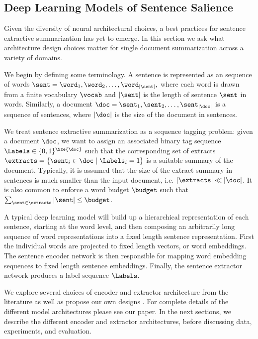 

\subsection{Deep Learning Models of Sentence Salience}

 Given the diversity of neural architectural choices, a best practices
for sentence extractive summarization has yet to emerge. In this section
we ask what architecture design choices matter for single document 
summarization across a variety of domains.

We begin by defining some terminology. A sentence is represented as an
sequence of words $\sent = \word_1, \word_2, \ldots, \word_{|\sent|},$
where each word is drawn from a finite vocabulary $\vocab$ and $|\sent|$ is
the length of sentence $\sent$ in words. Similarly, a document $\doc =  
\sent_1, \sent_2, \ldots, \sent_{|\doc|} $ is a sequence of sentences, where 
$|\doc|$ is the size of the document in sentences.  

We treat sentence extractive summarization as a sequence tagging
problem: given a document $\doc$, we want to assign an associated binary
tag sequence $\Labels \in \{0,1\}^{\Sze{\doc}}$ such that the corresponding
set of extracts $\extracts = \{\sent_i \in \doc \; | \; \Labels_i =1 \}$ is
a suitable summary
of the document. Typically, it is assumed that the size of the extract summary
in sentences is much smaller than the input document, i.e. 
$|\extracts|  \ll |\doc|$.
It is also common to enforce a word budget $\budget$ such that
$\sum_{\sent \in \extracts} |\sent| \le \budget$.

A typical deep learning model will build up a hierarchical representation
of each sentence, starting at the word level, and then composing an arbitrarily
long sequence of word representations into a fixed length sentence 
representation.
First the individual words are 
projected to fixed length vectors, or word embeddings. %
The sentence encoder network %
is then 
responsible for mapping word embedding sequences to fixed length sentence 
embeddings. Finally, the sentence extractor network %
produces a label 
sequence $\Labels$.

We explore several choices of encoder and extractor architecture from the 
literature \cite{cheng2016neural,nallapati2016summarunner} as well as 
propose our own designs \cite{kedzie2018deep}. For complete details of 
the different model architectures please see our paper. In the next sections,
we describe the different encoder and extractor architectures, before 
discussing data, experiments, and evaluation. 

